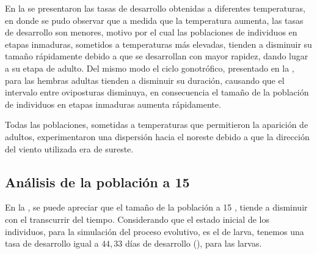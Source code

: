 En la  se presentaron las tasas de desarrollo obtenidas a
diferentes temperaturas, en donde se pudo observar que a medida que la temperatura aumenta, las
tasas de desarrollo son menores, motivo por el cual las poblaciones de individuos en etapas
inmaduras, sometidos a temperaturas más elevadas, tienden a disminuir su tamaño rápidamente debido
a que se desarrollan con mayor rapidez, dando lugar a su etapa de adulto. Del mismo modo el ciclo
gonotrófico, presentado en la , para las hembras adultas
tienden a disminuir su duración, causando que el intervalo entre oviposturas disminuya, en
consecuencia el tamaño de la población de individuos en etapas inmaduras aumenta rápidamente.

Todas las poblaciones, sometidas a temperaturas que permitieron la aparición de adultos,
experimentaron una dispersión hacia el noreste debido a que la dirección del viento utilizada era
de sureste.


\subsection{Análisis de la población a 15 \textcelsius}
En la , se puede apreciar que el tamaño de la población a 15
\textcelsius, tiende a disminuir con el transcurrir del tiempo. Considerando que el estado inicial
de los individuos, para la simulación del proceso evolutivo, es el de larva, tenemos una tasa de
desarrollo igual a $44,33$ días de desarrollo
(), para las larvas.

